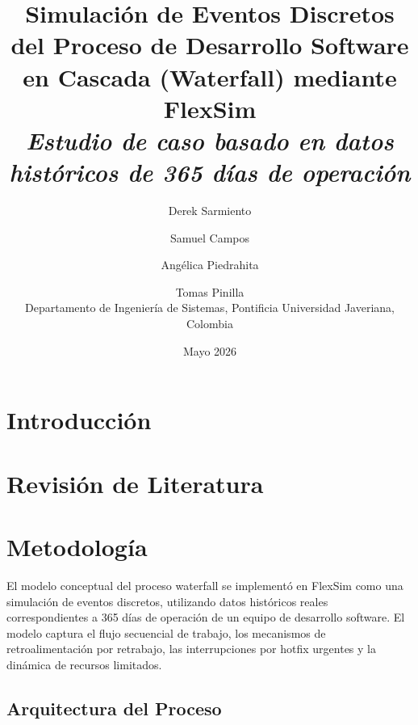 \documentclass[12pt]{article}
\title{
    Simulación de Eventos Discretos del Proceso de Desarrollo
    Software en Cascada (Waterfall) mediante FlexSim\\[0.4em]
    \large \textit{Estudio de caso basado en datos históricos
           de 365 días de operación}
}
\author{
    Derek Sarmiento \and
    Samuel Campos \and
    Angélica Piedrahita \and
    Tomas Pinilla \\[0.5em]
    \small Departamento de Ingeniería de Sistemas,
    Pontificia Universidad Javeriana, Colombia
}
\date{Mayo 2026}
\begin{document}
\maketitle
\thispagestyle{empty}

\begin{abstract}
\end{abstract}

\newpage
\tableofcontents
\newpage

\section{Introducción}
\label{sec:introduccion}


\section{Revisión de Literatura}
\label{sec:literatura}


\section{Metodología}
\label{sec:metodologia}

El modelo conceptual del proceso waterfall se implementó en FlexSim
como una simulación de eventos discretos, utilizando datos históricos
reales correspondientes a 365 días de operación de un equipo de
desarrollo software. El modelo captura el flujo secuencial de trabajo,
los mecanismos de retroalimentación por retrabajo, las interrupciones
por hotfix urgentes y la dinámica de recursos limitados.

\subsection{Arquitectura del Proceso}
\end{document}
